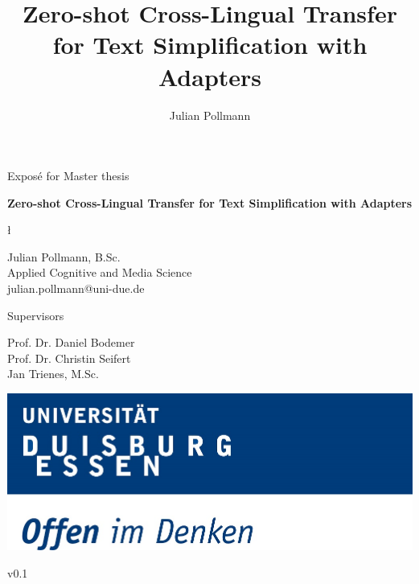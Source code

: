 \documentclass[acmlarge,screen,nonacm]{acmart}
\begin{document}
\title{Zero-shot Cross-Lingual Transfer for Text Simplification with Adapters}

\author{Julian Pollmann}

\begin{titlepage}

  \begin{center}
    \Large{Exposé for Master thesis}
  \end{center}

  \begin{center}
    \vspace{0.03\textheight}
    \begin{huge}
      \textbf{Zero-shot Cross-Lingual Transfer for Text Simplification with Adapters}
    \end{huge}ł

    \vspace{0.03\textheight}
    \Large{Julian Pollmann, B.Sc. \\
    Applied Cognitive and Media Science \\
    julian.pollmann@uni-due.de }

    \vspace{0.5\textheight}
  \end{center}


  \begin{center}

    \Large{Supervisors}

    \Large{Prof. Dr. Daniel Bodemer\\}
    \Large{Prof. Dr. Christin Seifert\\}
    \Large{Jan Trienes, M.Sc.\\}

    \vspace{0.03\textheight}

    \includegraphics[height=15ex]{./figures/ude-logo.jpg}\\

    \vfill

    \normalsize{v0.1}
  \end{center}

\end{titlepage}








\end{document}
